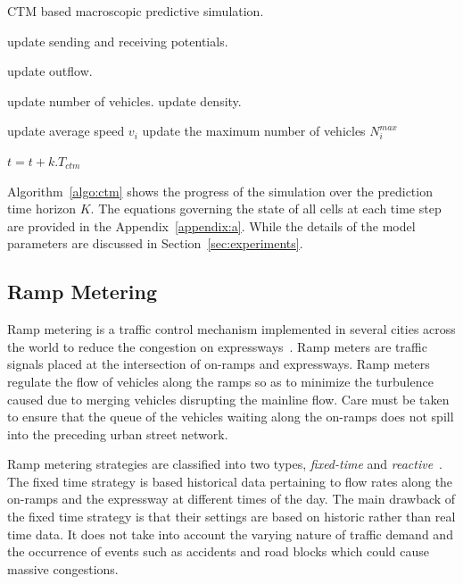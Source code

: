 \documentclass{wscpaperproc}
\theoremstyle{wsc}
\begin{document}
\begin{algorithm}[h]
\caption{CTM based macroscopic predictive simulation.}
\label{algo:ctm}

\begin{algorithmic}[1]

\State update sending and receiving potentials.
\EndFor

\State update outflow.
\EndFor

\State update number of vehicles.
\State update density.
\EndFor

\State update average speed $v_{i}$
\State update the maximum number of vehicles $N^{max}_{i}$
\EndFor

$t=t+k.T_{ctm}$
\EndWhile


\end{algorithmic}
\end{algorithm}

Algorithm~\ref{algo:ctm} shows the progress of the simulation over the prediction time horizon $K$. The equations governing the state of all cells at each time step are provided in the Appendix~\ref{appendix:a}. While the details of the model parameters are discussed in Section~\ref{sec:experiments}.


\subsection{Ramp Metering}
\label{subsec:ramp-metering}
Ramp metering is a traffic control mechanism implemented in several cities across the world to reduce the congestion on expressways~\cite{bogenberger1999advanced}. Ramp meters are traffic signals placed at the intersection of on-ramps and expressways. Ramp meters regulate the flow of vehicles along the ramps so as to minimize the turbulence caused due to merging vehicles disrupting the mainline flow. Care must be taken to ensure that the queue of the vehicles waiting along the on-ramps does not spill into the preceding urban street network. 

Ramp metering strategies are classified into two types, {\it fixed-time} and {\it reactive}~. The fixed time strategy is based historical data pertaining to flow rates along the on-ramps and the expressway at different times of the day. The main drawback of the fixed time strategy is that their settings are based on historic rather than real time data. It does not take into account the varying nature of traffic demand and the occurrence of events such as accidents and road blocks which could cause massive congestions. 
\end{document}
